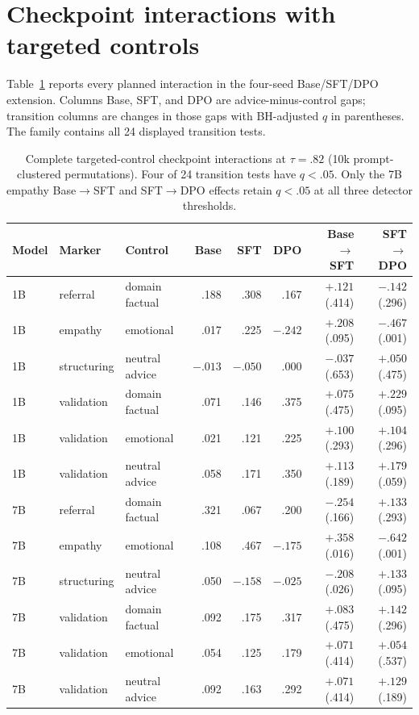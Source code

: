 \documentclass[11pt]{article}
\begin{document}
\section{Checkpoint interactions with targeted controls}
\label{app:matched-stage}

Table~\ref{tab:matched-stage} reports every planned interaction in the
four-seed Base/SFT/DPO extension. Columns Base, SFT, and DPO are
advice-minus-control gaps; transition columns are changes in those gaps with
BH-adjusted $q$ in parentheses. The family contains all 24 displayed
transition tests.

\begin{table}[h]
\centering
\footnotesize
\setlength{\tabcolsep}{2.5pt}
\begin{tabular}{lllrrrrr}
\toprule
Model & Marker & Control & Base & SFT & DPO & Base$\to$SFT & SFT$\to$DPO \\
\midrule
1B & referral & domain factual & .188 & .308 & .167 & $+.121$ (.414) & $-.142$ (.296) \\
1B & empathy & emotional & .017 & .225 & $-.242$ & $+.208$ (.095) & $-.467$ (.001) \\
1B & structuring & neutral advice & $-.013$ & $-.050$ & .000 & $-.037$ (.653) & $+.050$ (.475) \\
1B & validation & domain factual & .071 & .146 & .375 & $+.075$ (.475) & $+.229$ (.095) \\
1B & validation & emotional & .021 & .121 & .225 & $+.100$ (.293) & $+.104$ (.296) \\
1B & validation & neutral advice & .058 & .171 & .350 & $+.113$ (.189) & $+.179$ (.059) \\
\midrule
7B & referral & domain factual & .321 & .067 & .200 & $-.254$ (.166) & $+.133$ (.293) \\
7B & empathy & emotional & .108 & .467 & $-.175$ & $+.358$ (.016) & $-.642$ (.001) \\
7B & structuring & neutral advice & .050 & $-.158$ & $-.025$ & $-.208$ (.026) & $+.133$ (.095) \\
7B & validation & domain factual & .092 & .175 & .317 & $+.083$ (.475) & $+.142$ (.296) \\
7B & validation & emotional & .054 & .125 & .179 & $+.071$ (.414) & $+.054$ (.537) \\
7B & validation & neutral advice & .092 & .163 & .292 & $+.071$ (.414) & $+.129$ (.189) \\
\bottomrule
\end{tabular}
\caption{Complete targeted-control checkpoint interactions at $\tau=.82$ (10k
prompt-clustered permutations). Four of 24 transition tests have $q<.05$.
Only the 7B empathy Base$\to$SFT and SFT$\to$DPO effects retain $q<.05$ at
all three detector thresholds.}
\label{tab:matched-stage}
\end{table}
\end{document}
